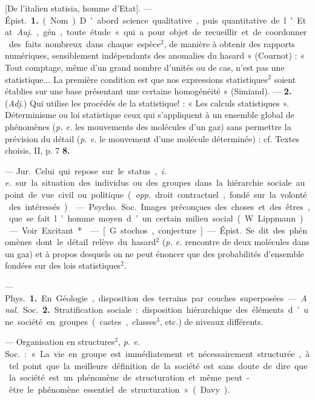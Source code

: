 \begin{itemize}[leftmargin=1cm, label=, itemsep=1pt]
 [De l'italien statisia, homme
d'Etat]. — \si{Épist.} {\bf 1.} (Nom). D'abord
science qualitative, puis quantitative de l'Etat. {\it Auj.}, gén, toute
étude « qui a pour objet de recueillir
et de coordonner des faits nombreux dans chaque espèce$^2$, de manière à obtenir des rapports numériques, sensiblement indépendants
des anomalies du hasard » (Cournot) :
« Tout comptage, même d’un grand
nombre d'unités ou de cas, n’est pas
une statistique... La première condition est que nos expressions statistiques$^2$ soient établies sur une base
présentant une certaine homogénéité » (Simiand). — {\bf 2.} ({\it Adj.}) Qui
utilise les procédés de la statistique! : « Les calculs statistiques ».
Déterminisme ou loi statistique
ceux qui s'appliquent à un ensemble
global de phénomènes ({\it p. e.} les mouvements des molécules d’un gaz)
sans permettre la prévision du détail
({\it p. e.} le mouvement d’une molécule
déterminée) : cf. Textes choisis, II,
p. 7 {\bf 8.}

 — \si{Jur.} Celui qui
repose sur le status, {\it i. e.} sur la situation des individus ou des groupes
dans la hiérarchie sociale au point
de vue civil ou politique ({\it opp.} droit
contractuel, fondé sur la volonté
des intéressés).

 — \si{Psycho.} \si{Soc.} Images
préconçues des choses et des êtres,
que se fait l'homme moyen d’un
certain milieu social (W. Lippmann).

 — Voir Excitant*.

 — [G. stochos, conjecture] — \si{Épist.} Se dit des phénomènes
dont le détail relève du
hasard$^2$ ({\it p. e.} rencontre de deux molécules dans un gaz) et à propos desquels on ne peut énoncer que des
probabilités d'ensemble fondées sur
des lois statistiques$^2$.

 — \si{Phys.} {\bf 1.} En Géologie,
disposition des terrains par couches
superposées. — {\it Anal.} \si{Soc.} {\bf 2.} Stratification sociale : disposition hiérarchique
des éléments d’une société en groupes
(castes, classes$^3$, etc.) de niveaux
différents.

 — Organisation en
structures$^2$, {\it p. e.} \si{Soc.} : « La vie en
groupe est immédiatement et nécessairement structurée, à tel point
que la meilleure définition de la
société est sans doute de dire que la
société est un phénomène de structuration et même peut-être le phénomène essentiel de structuration »
(Davy).


\end{itemize}
